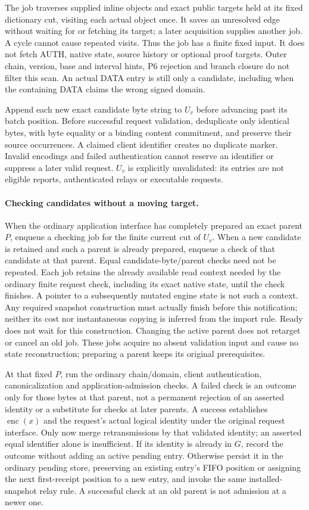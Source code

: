The job traverses supplied inline objects and exact public targets held
at its fixed dictionary cut, visiting each actual object once. It saves
an unresolved edge without waiting for or fetching its target; a later
acquisition supplies another job. A cycle cannot cause repeated visits.
Thus the job has a finite fixed input. It does not fetch AUTH, native
state, source history or optional proof targets. Outer chain, version,
base and interval hints, P6 rejection and branch closure do not filter
this scan. An actual DATA entry is still only a candidate, including
when the containing DATA claims the wrong signed domain.

Append each new exact candidate byte string to $U_v$ before advancing
past its batch position. Before successful request validation,
deduplicate only identical bytes, with byte equality or a binding
content commitment, and preserve their source occurrences. A claimed
client identifier creates no duplicate marker. Invalid encodings and
failed authentication cannot reserve an identifier or suppress a later
valid request. $U_v$ is explicitly unvalidated: its entries are not
eligible reports, authenticated relays or executable requests.

\paragraph{Checking candidates without a moving target.}
When the ordinary application interface has completely prepared an exact
parent $P$, enqueue a checking job for the finite current cut of $U_v$.
When a new candidate is retained and such a parent is already prepared,
enqueue a check of that candidate at that parent. Equal
candidate-byte/parent checks need not be repeated. Each job retains the
already available read context needed by the ordinary finite request
check, including its exact native state, until the check finishes.
A pointer to a subsequently mutated engine state is not such a context.
Any required snapshot construction must actually finish before this
notification; neither its cost nor instantaneous copying is inferred
from the import rule. Ready does not wait for this construction.
Changing the active parent does not retarget or cancel an old job.
These jobs acquire no absent validation input and cause no state
reconstruction; preparing a parent keeps its original prerequisites.

At that fixed $P$, run the ordinary chain/domain, client authentication,
canonicalization and application-admission checks. A failed check is an
outcome only for those bytes at that parent, not a permanent rejection
of an asserted identity or a substitute for checks at later parents.
A success establishes $\operatorname{enc}(x)$ and the request's actual
logical identity under the original request interface. Only now merge
retransmissions by that validated identity; an asserted equal identifier
alone is insufficient. If its identity is already in $G$, record the
outcome without adding an active pending entry. Otherwise persist it in
the ordinary pending store, preserving an existing entry's FIFO position
or assigning the next first-receipt position to a new entry, and invoke
the same installed-snapshot relay rule. A successful check at an old
parent is not admission at a newer one.

